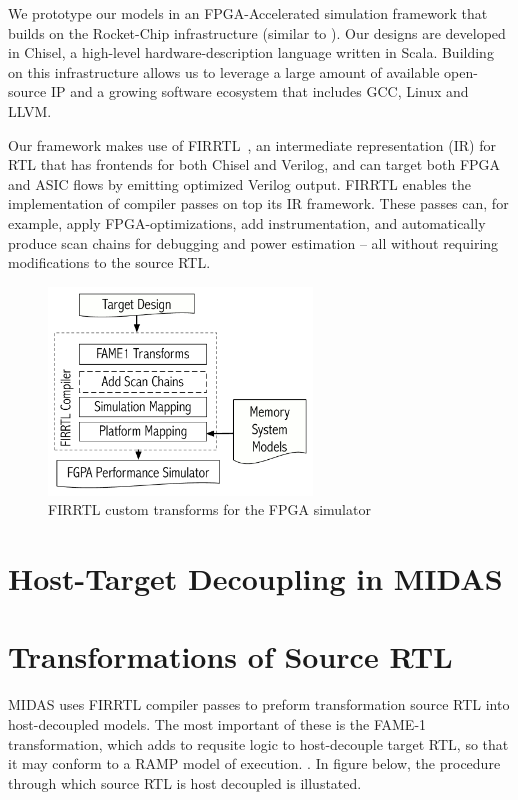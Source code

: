 We prototype our models in an FPGA-Accelerated simulation framework that builds on
the Rocket-Chip \cite{rocketchip} infrastructure (similar to
\cite{strober}). Our designs are developed in Chisel, a high-level
hardware-description language written in Scala. Building on this infrastructure
allows us to leverage a large amount of available open-source IP and a growing
software ecosystem that includes GCC, Linux and LLVM.

Our framework makes use of FIRRTL~\cite{firrtl}, an intermediate representation
(IR) for RTL that has frontends for both Chisel and Verilog, and can target
both FPGA and ASIC flows by emitting optimized Verilog output. FIRRTL enables
the implementation of compiler passes on top its IR framework. These passes
can, for example, apply FPGA-optimizations, add instrumentation, and
automatically produce scan chains for debugging and power
estimation\cite{strober} -- all without requiring modifications to the source
RTL.

\begin{figure}
	\centering
	\includegraphics[width=7cm]{figures/firrtl.pdf}
	\caption{FIRRTL custom transforms for the FPGA simulator}
	\label{fig:firrtl}
\end{figure}


\section{Host-Target Decoupling in MIDAS}

\section{Transformations of Source RTL}

MIDAS uses FIRRTL compiler passes to preform transformation source RTL into
host-decoupled models. The most important of these is the FAME-1
transformation, which adds to requsite logic to host-decouple target RTL, so
that it may conform to a RAMP model of execution. . In figure
 below, the procedure through which source RTL is
host decoupled is illustated.


